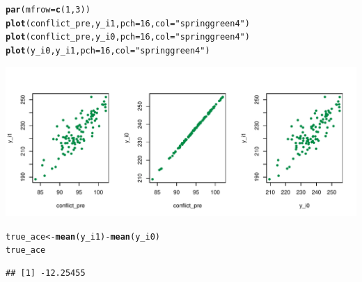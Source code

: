 \documentclass[12 pt]{article}\usepackage[]{graphicx}\usepackage[]{color}
\makeatletter
\def\maxwidth{ %
  \ifdim\Gin@nat@width>\linewidth
    \linewidth
  \else
    \Gin@nat@width
  \fi
}
\newcommand{\hlnum}[1]{\textcolor[rgb]{0.686,0.059,0.569}{#1}}%
\newcommand{\hlstr}[1]{\textcolor[rgb]{0.192,0.494,0.8}{#1}}%
\newcommand{\hlopt}[1]{\textcolor[rgb]{0,0,0}{#1}}%
\newcommand{\hlstd}[1]{\textcolor[rgb]{0.345,0.345,0.345}{#1}}%
\newcommand{\hlkwb}[1]{\textcolor[rgb]{0.69,0.353,0.396}{#1}}%
\newcommand{\hlkwc}[1]{\textcolor[rgb]{0.333,0.667,0.333}{#1}}%
\newcommand{\hlkwd}[1]{\textcolor[rgb]{0.737,0.353,0.396}{\textbf{#1}}}%
\newenvironment{kframe}{%
 \def\at@end@of@kframe{}%
 \ifinner\ifhmode%
  \def\at@end@of@kframe{\end{minipage}}%
  \begin{minipage}{\columnwidth}%
 \fi\fi%
 \def\FrameCommand##1{\hskip\@totalleftmargin \hskip-\fboxsep
 \colorbox{shadecolor}{##1}\hskip-\fboxsep
     \hskip-\linewidth \hskip-\@totalleftmargin \hskip\columnwidth}%
 \MakeFramed {\advance\hsize-\width
   \@totalleftmargin\z@ \linewidth\hsize
   \@setminipage}}%
 {\par\unskip\endMakeFramed%
 \at@end@of@kframe}
\newenvironment{knitrout}{}{} %
\makeatother
\begin{document}
\begin{knitrout}
\color{fgcolor}\begin{kframe}
\begin{alltt}
\hlkwd{par}\hlstd{(}\hlkwc{mfrow} \hlstd{=} \hlkwd{c}\hlstd{(}\hlnum{1}\hlstd{,} \hlnum{3}\hlstd{))}
\hlkwd{plot}\hlstd{(conflict_pre, y_i1,} \hlkwc{pch} \hlstd{=} \hlnum{16}\hlstd{,} \hlkwc{col} \hlstd{=} \hlstr{"springgreen4"}\hlstd{)}
\hlkwd{plot}\hlstd{(conflict_pre, y_i0,} \hlkwc{pch} \hlstd{=} \hlnum{16}\hlstd{,} \hlkwc{col} \hlstd{=} \hlstr{"springgreen4"}\hlstd{)}
\hlkwd{plot}\hlstd{(y_i0, y_i1,} \hlkwc{pch} \hlstd{=} \hlnum{16}\hlstd{,} \hlkwc{col} \hlstd{=} \hlstr{"springgreen4"}\hlstd{)}
\end{alltt}
\end{kframe}

{\centering \includegraphics[width=\maxwidth]{figure/minimal-unnamed-chunk-2-1} 

}



\end{knitrout}

\begin{knitrout}
\color{fgcolor}\begin{kframe}
\begin{alltt}
\hlstd{true_ace} \hlkwb{<-} \hlkwd{mean}\hlstd{(y_i1)} \hlopt{-} \hlkwd{mean}\hlstd{(y_i0)}
\hlstd{true_ace}
\end{alltt}
\begin{verbatim}
## [1] -12.25455
\end{verbatim}
\end{kframe}
\end{knitrout}
\end{document}
